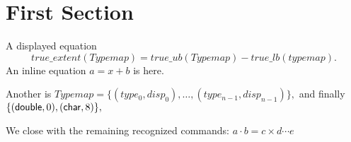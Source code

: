 

\section{First Section}

A displayed equation
\[
true\_extent (Typemap) = true\_ub(Typemap) - true\_lb(typemap).
\]
An inline equation \( a = x + b \) is here.

Another is
\(
Typemap = \{ (type_0,disp_0), \ldots, (type_{n-1}, disp_{n-1}) \} ,
\)
and finally
\(
\{ ({\sf double}, 0), ({\sf char}, 8) \} ,
\)

We close with the remaining recognized commands:
\(
a \cdot b = c \times d \cdots e
\)


